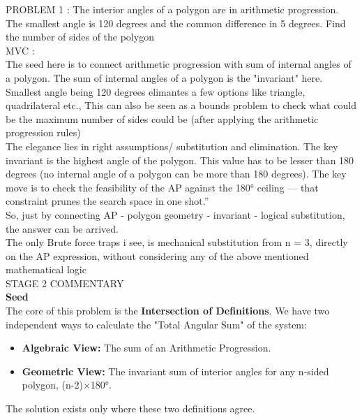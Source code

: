 \documentclass{article}
\begin{document}
\noindent PROBLEM 1 : The interior angles of a polygon are in arithmetic progression. The smallest angle is 120 degrees and the common difference in 5 degrees. Find the number of sides of the polygon \\

\noindent MVC : \\

\noindent The seed here is to connect arithmetic progression with sum of internal angles of a polygon. The sum of internal angles of a polygon is the "invariant" here. \\

\noindent Smallest angle being 120 degrees elimantes a few options like triangle, quadrilateral etc., This can also be seen as a bounds problem to check what could be the maximum number of sides could be (after applying the arithmetic progression rules) \\

\noindent The elegance lies in right assumptions/ substitution and elimination. The key invariant is the highest angle of the polygon. This value has to be lesser than 180 degrees (no internal angle of a polygon can be more than 180 degrees). The key move is to check the feasibility of the AP against the 180° ceiling — that constraint prunes the search space in one shot.” \\

\noindent So, just by connecting AP - polygon geometry - invariant - logical substitution, the answer can be arrived. \\

\noindent The only Brute force traps i see, is mechanical substitution from n = 3, directly on the AP expression, without considering any of the above mentioned mathematical logic \\

\noindent STAGE 2 COMMENTARY \\

\noindent \textbf{Seed} \\

\noindent The core of this problem is the \textbf{Intersection of Definitions}. We have two independent ways to calculate the "Total Angular Sum" of the system:
\begin{itemize}
    \item \textbf{Algebraic View:} The sum of an Arithmetic Progression.
    \item \textbf{Geometric View:} The invariant sum of interior angles for any n-sided polygon, (n-2)×180°.
\end{itemize}
\noindent The solution exists only where these two definitions agree. \\
\end{document}

